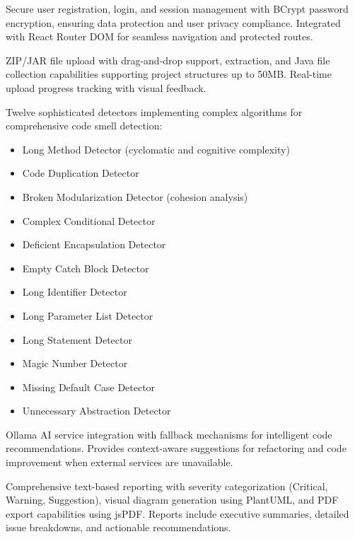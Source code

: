 \documentclass[12pt,a4paper]{article}
\begin{document}
    \begin{description}[font=\bfseries, leftmargin=0.5in]
        \item[User Authentication System]
        Secure user registration, login, and session management with BCrypt password encryption, ensuring data protection and user privacy compliance. Integrated with React Router DOM for seamless navigation and protected routes.

        \item[File Upload and Processing]
        ZIP/JAR file upload with drag-and-drop support, extraction, and Java file collection capabilities supporting project structures up to 50MB. Real-time upload progress tracking with visual feedback.

        \item[Advanced Code Analysis Engine]
        Twelve sophisticated detectors implementing complex algorithms for comprehensive code smell detection:
        \begin{itemize}[leftmargin=0.3in, font=\normalfont]
            \item Long Method Detector (cyclomatic and cognitive complexity)
            \item Code Duplication Detector
            \item Broken Modularization Detector (cohesion analysis)
            \item Complex Conditional Detector
            \item Deficient Encapsulation Detector
            \item Empty Catch Block Detector
            \item Long Identifier Detector
            \item Long Parameter List Detector
            \item Long Statement Detector
            \item Magic Number Detector
            \item Missing Default Case Detector
            \item Unnecessary Abstraction Detector
        \end{itemize}

        \item[AI Integration Module]
        Ollama AI service integration with fallback mechanisms for intelligent code recommendations. Provides context-aware suggestions for refactoring and code improvement when external services are unavailable.

        \item[Report Generation System]
        Comprehensive text-based reporting with severity categorization (Critical, Warning, Suggestion), visual diagram generation using PlantUML, and PDF export capabilities using jsPDF. Reports include executive summaries, detailed issue breakdowns, and actionable recommendations.


\end{description}
\end{document}
